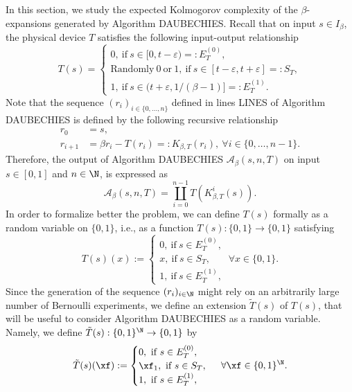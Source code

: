 In this section, we study the expected Kolmogorov complexity of the $\beta$-expansions generated by Algorithm DAUBECHIES. Recall that on input $s \in I_\beta$, the physical device $T$ satisfies the following input-output relationship
\begin{equation}
    T(s) = \begin{cases}
        0, \ \text{if} \ s \in [0, t - \varepsilon) =: E_T^{(0)},\\
        \text{Randomly} \ 0 \ \text{or} \ 1, \ \text{if} \ s \in [t - \varepsilon, t + \varepsilon] =: S_T,\\
        1, \ \text{if} \ s \in (t + \varepsilon, 1/(\beta-1)] =: E_T^{(1)}.
    \end{cases}
\end{equation}
Note that the sequence $(r_i)_{i \in \{0, \ldots, n\}}$ defined in lines LINES of Algorithm DAUBECHIES is defined by the following recursive relationship
\begin{align}
    r_0 &= s,\\
    r_{i+1} &= \beta r_i - T(r_i) =: K_{\beta,T}(r_i), \ \forall i \in \{0,\ldots, n-1\}.
\end{align}
Therefore, the output of Algorithm DAUBECHIES $\mathcal A_\beta(s,n,T)$ on input $s \in [0,1]$ and $n \in \N$, is expressed as
\begin{equation}
    \mathcal A_\beta(s,n,T) = \coprod_{i=0}^{n-1} T\left(K_{\beta,T}^i(s)\right).
\end{equation}
In order to formalize better the problem, we can define $T(s)$ formally as a random variable on $\{0,1\}$, i.e., as a function $T(s) : \{0,1\} \to \{0,1\}$ satisfying
\begin{equation}
    T(s)(x) := \begin{cases}
        0, \ \text{if} \ s \in  E_T^{(0)},\\
        x, \ \text{if} \ s \in  S_T,\\
        1, \ \text{if} \ s \in  E_T^{(1)},
    \end{cases}
    \ \forall x \in \{0,1\}.
\end{equation}
Since the generation of the sequence $(r_i)_{i \in \N}$ might rely on an arbitrarily large number of Bernoulli experiments, we define an extension $\tilde T(s)$ of $T(s)$, that will be useful to consider Algorithm DAUBECHIES as a random variable. Namely, we define $\tilde T(s) : \{0,1\}^\N \to \{0,1\}$ by 
\begin{equation}
    \tilde T(s)(\xf) := \begin{cases}
        0, \ \text{if} \ s \in  E_T^{(0)},\\
        \xf_1, \ \text{if} \ s \in  S_T,\\
        1, \ \text{if} \ s \in  E_T^{(1)},
    \end{cases}
    \ \forall \xf \in \{0,1\}^\N.
\end{equation}
